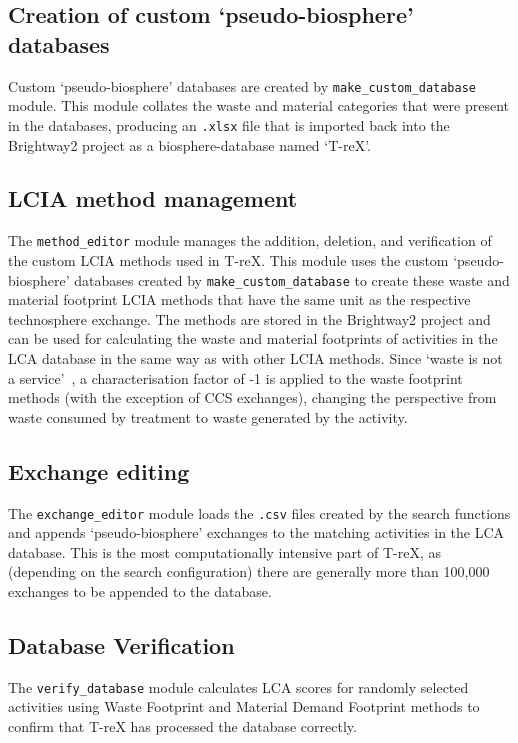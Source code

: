 \documentclass{article}
\renewcommand{\texttt}[1]{{\ttfamily\small\nolinkurl{#1}}}
\begin{document}
\subsection{Creation of custom `pseudo-biosphere' databases}
Custom `pseudo-biosphere' databases are created by \texttt{make\_custom\_database} module. This module collates the waste and material categories that were present in the databases, producing an \texttt{.xlsx} file that is imported back into the Brightway2 project as a biosphere-database named `T-reX'. 

\subsection{LCIA method management}
The \texttt{method\_editor} module manages the addition, deletion, and verification of the custom LCIA methods used in T-reX. This module uses the custom `pseudo-biosphere' databases created by \texttt{make\_custom\_database} to create these waste and material footprint LCIA methods that have the same unit as the respective technosphere exchange. The methods are stored in the Brightway2 project and can be used for calculating the waste and material footprints of activities in the LCA database in the same way as with other LCIA methods. Since `waste is not a service'~\citep{guinee2021wasteisnotaservice}, a characterisation factor of -1 is applied to the waste footprint methods (with the exception of CCS exchanges), changing the perspective from waste consumed by treatment to waste generated by the activity.

\subsection{Exchange editing}
The \texttt{exchange\_editor} module loads the \texttt{.csv} files created by the search functions and appends `pseudo-biosphere' exchanges to the matching activities in the LCA database. This is the most computationally intensive part of T-reX, as (depending on the search configuration) there are generally more than 100,000 exchanges to be appended to the database. 

\subsection{Database Verification}
The \texttt{verify\_database} module calculates LCA scores for randomly selected activities using Waste Footprint and Material Demand Footprint methods to confirm that T-reX has processed the database correctly.
\end{document}
